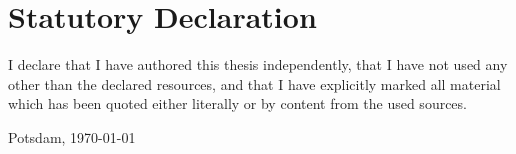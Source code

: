 \section*{Statutory Declaration}
I declare that I have authored this thesis independently, that I have not used any other than the declared resources, and that I have explicitly marked all material which has been quoted either literally or by content from the used sources.

Potsdam, \today
~\\
~\\
~\\
